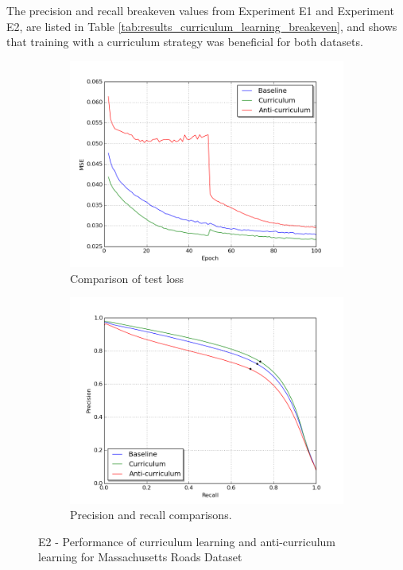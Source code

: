 The precision and recall breakeven values from Experiment E1 and Experiment E2, are listed in Table \ref{tab:results_curriculum_learning_breakeven}, and shows that training with a curriculum strategy was beneficial for both datasets.\\
\begin{figure}
\begin{subfigure}{0.48\textwidth}
\includegraphics[width=\linewidth]{figs/E2/E2-lc.png}
\caption{Comparison of test loss} \label{fig:E2_curr_mass_loss}
\end{subfigure}
\hspace*{\fill} %
\begin{subfigure}{0.48\textwidth}
\includegraphics[width=\linewidth]{figs/E2/E2-pr.png}
\caption{Precision and recall comparisons.} \label{fig:E2_curr_mass_pr}
\end{subfigure}
\hspace*{\fill} %
\caption{E2 - Performance of curriculum learning and anti-curriculum learning for Massachusetts Roads Dataset} \label{fig:E2_curriculum_mass}
\end{figure}

